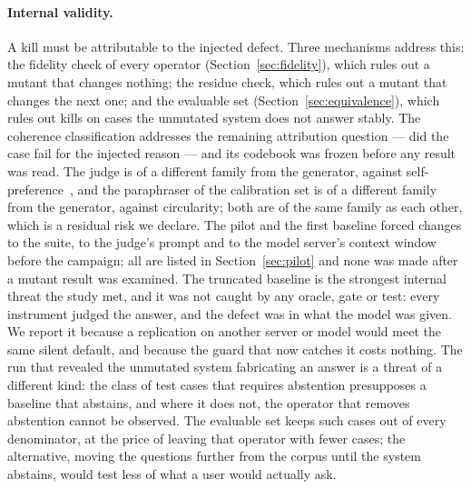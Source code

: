 \documentclass[a4paper,fleqn]{cas-dc}
\begin{document}
\paragraph{Internal validity.} A kill must be attributable to the injected
defect. Three mechanisms address this: the fidelity check of every operator
(Section~\ref{sec:fidelity}), which rules out a mutant that changes nothing;
the residue check, which rules out a mutant that changes the next one; and the
evaluable set (Section~\ref{sec:equivalence}), which rules out kills on cases
the unmutated system does not answer stably. The coherence classification
addresses the remaining attribution question --- did the case fail for the
injected reason --- and its codebook was frozen before any result was read.
The judge is of a different family from the generator, against
self-preference~\cite{panickssery2024llm}, and the paraphraser of the
calibration set is of a different family from the generator, against
circularity; both are of the same family as each other, which is a residual
risk we declare. The pilot and the first baseline forced changes to the suite, to the
judge's prompt and to the model server's context window before the campaign;
all are listed in Section~\ref{sec:pilot} and none was made after a mutant
result was examined. The truncated baseline is the strongest internal threat
the study met, and it was not caught by any oracle, gate or test: every
instrument judged the answer, and the defect was in what the model was given.
We report it because a replication on another server or model would meet the
same silent default, and because the guard that now catches it costs nothing. The run that revealed the
unmutated system fabricating an answer is a threat of a different kind: the
class of test cases that requires abstention presupposes a baseline that
abstains, and where it does not, the operator that removes abstention cannot
be observed. The evaluable set keeps such cases out of every denominator, at
the price of leaving that operator with fewer cases; the alternative, moving
the questions further from the corpus until the system abstains, would test
less of what a user would actually ask.
\end{document}
